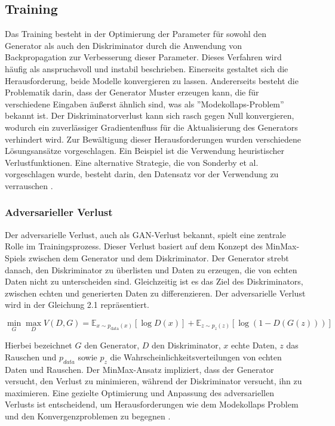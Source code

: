 \subsection{Training}
Das Training besteht in der Optimierung der Parameter für sowohl den Generator als auch den Diskriminator durch die Anwendung von Backpropagation zur Verbesserung dieser Parameter. Dieses Verfahren wird häufig als anspruchsvoll und instabil beschrieben. Einerseits gestaltet sich die Herausforderung, beide Modelle konvergieren zu lassen. Andererseits besteht die Problematik darin, dass der Generator Muster erzeugen kann, die für verschiedene Eingaben äußerst ähnlich sind, was als ''Modekollaps-Problem'' bekannt ist. Der Diskriminatorverlust kann sich rasch gegen Null konvergieren, wodurch ein zuverlässiger Gradientenfluss für die Aktualisierung des Generators verhindert wird.
Zur Bewältigung dieser Herausforderungen wurden verschiedene Lösungsansätze vorgeschlagen. Ein Beispiel ist die Verwendung heuristischer Verlustfunktionen. Eine alternative Strategie, die von Sonderby et al. vorgeschlagen wurde, besteht darin, den Datensatz vor der Verwendung zu verrauschen \cite{Creswell.2018}.

\subsubsection*{Adversarieller Verlust}
Der adversarielle Verlust, auch als GAN-Verlust bekannt, spielt eine zentrale Rolle im Trainingsprozess. Dieser Verlust basiert auf dem Konzept des MinMax-Spiels zwischen dem Generator und dem Diskriminator. Der Generator strebt danach, den Diskriminator zu überlisten und Daten zu erzeugen, die von echten Daten nicht zu unterscheiden sind. Gleichzeitig ist es das Ziel des Diskriminators, zwischen echten und generierten Daten zu differenzieren. Der adversarielle Verlust wird in der Gleichung 2.1 repräsentiert.

\begin{equation}
    \min_G \max_D V(D, G) = \mathbb{E}_{x\sim p_{\text{data}}(x)}[\log D(x)] + \mathbb{E}_{z\sim p_z(z)}[\log(1 - D(G(z)))]
\end{equation}

Hierbei bezeichnet $G$ den Generator, $D$ den Diskriminator, $x$ echte Daten, $z$ das Rauschen und $p_{data}$ sowie $p_z$ die Wahrscheinlichkeitsverteilungen von echten Daten und Rauschen. Der MinMax-Ansatz impliziert, dass der Generator versucht, den Verlust zu minimieren, während der Diskriminator versucht, ihn zu maximieren. Eine gezielte Optimierung und Anpassung des adversariellen Verlusts ist entscheidend, um Herausforderungen wie dem Modekollaps Problem und den Konvergenzproblemen zu begegnen \cite{Hong.2020}.

